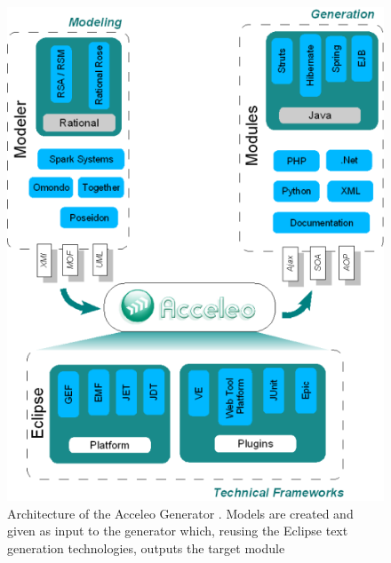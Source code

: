 \begin{figure}
  \begin{center}
    \includegraphics[scale=0.7]{pictures/acceleo-archi-en.png}
    \caption{Architecture of the Acceleo Generator \cite{AcceleoArchitectureWeb}. Models are created and given as input to the generator which, reusing the Eclipse text generation technologies, outputs the target module}
    \label{fig:AcceleoArchitecture}
  \end{center}
\end{figure}






